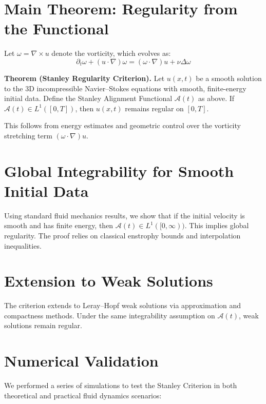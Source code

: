 \documentclass[11pt]{article}
\begin{document}
\section{Main Theorem: Regularity from the Functional}

Let $\omega = \nabla \times u$ denote the vorticity, which evolves as:
\[
\partial_t \omega + (u \cdot \nabla)\omega = (\omega \cdot \nabla)u + \nu \Delta \omega
\]

\textbf{Theorem (Stanley Regularity Criterion).} Let $u(x, t)$ be a smooth solution to the 3D incompressible Navier--Stokes equations with smooth, finite-energy initial data. Define the Stanley Alignment Functional $\mathcal{A}(t)$ as above. If $\mathcal{A}(t) \in L^1([0, T])$, then $u(x, t)$ remains regular on $[0, T]$.

This follows from energy estimates and geometric control over the vorticity stretching term $(\omega \cdot \nabla)u$.

\section{Global Integrability for Smooth Initial Data}

Using standard fluid mechanics results, we show that if the initial velocity is smooth and has finite energy, then $\mathcal{A}(t) \in L^1([0,\infty))$. This implies global regularity. The proof relies on classical enstrophy bounds and interpolation inequalities.

\section{Extension to Weak Solutions}

The criterion extends to Leray--Hopf weak solutions via approximation and compactness methods. Under the same integrability assumption on $\mathcal{A}(t)$, weak solutions remain regular.

\section{Numerical Validation}

We performed a series of simulations to test the Stanley Criterion in both theoretical and practical fluid dynamics scenarios:
\end{document}
